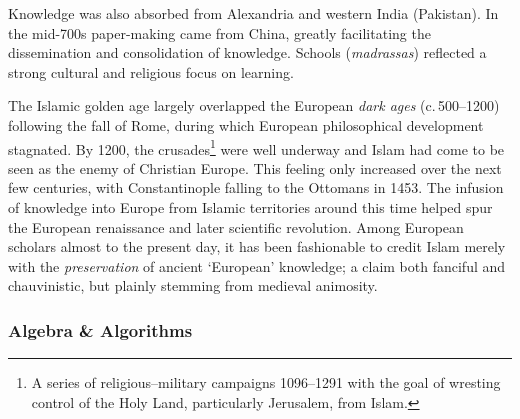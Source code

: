 Knowledge was also absorbed from Alexandria and western India (Pakistan). In the mid-700s paper-making came from China, greatly facilitating the dissemination and consolidation of knowledge. Schools (\emph{madrassas}) reflected a strong cultural and religious focus on learning.\smallbreak
 
The Islamic golden age largely overlapped the European \emph{dark ages} (c.\,500--1200) following the fall of Rome, during which European philosophical development stagnated. By 1200, the crusades\footnote{%
	A series of religious--military campaigns 1096--1291 with the goal of wresting control of the Holy Land, particularly Jerusalem, from Islam.%
}
were well underway and Islam had come to be seen as the enemy of Christian Europe. This feeling only increased over the next few centuries, with Constantinople falling to the Ottomans in 1453. The infusion of knowledge into Europe from Islamic territories around this time helped spur the European renaissance and later scientific revolution. Among European scholars almost to the present day, it has been fashionable to credit Islam merely with the \emph{preservation} of ancient `European' knowledge; a claim both fanciful and chauvinistic, but plainly stemming from medieval animosity.



\subsubsection*{Algebra \& Algorithms}

